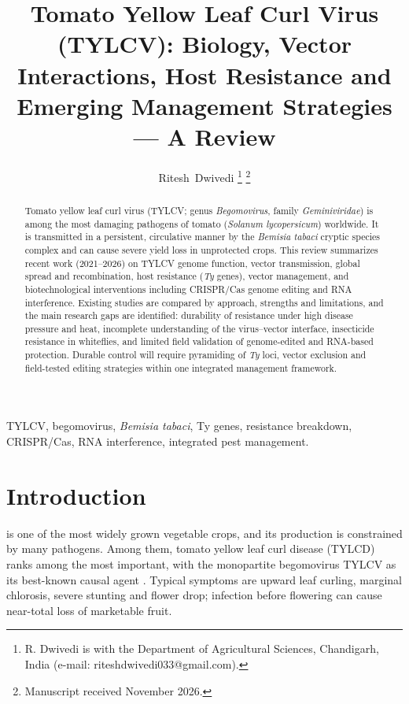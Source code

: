 \documentclass[journal]{IEEEtran}
\begin{document}
\title{Tomato Yellow Leaf Curl Virus (TYLCV): Biology, Vector Interactions, Host Resistance and Emerging Management Strategies --- A Review}

\author{Ritesh~Dwivedi%
\thanks{R. Dwivedi is with the Department of Agricultural Sciences, Chandigarh, India (e-mail: riteshdwivedi033@gmail.com).}%
\thanks{Manuscript received November 2026.}}


\maketitle

\begin{abstract}
Tomato yellow leaf curl virus (TYLCV; genus \textit{Begomovirus}, family \textit{Geminiviridae}) is among the most damaging pathogens of tomato (\textit{Solanum lycopersicum}) worldwide. It is transmitted in a persistent, circulative manner by the \textit{Bemisia tabaci} cryptic species complex and can cause severe yield loss in unprotected crops. This review summarizes recent work (2021--2026) on TYLCV genome function, vector transmission, global spread and recombination, host resistance (\textit{Ty} genes), vector management, and biotechnological interventions including CRISPR/Cas genome editing and RNA interference. Existing studies are compared by approach, strengths and limitations, and the main research gaps are identified: durability of resistance under high disease pressure and heat, incomplete understanding of the virus--vector interface, insecticide resistance in whiteflies, and limited field validation of genome-edited and RNA-based protection. Durable control will require pyramiding of \textit{Ty} loci, vector exclusion and field-tested editing strategies within one integrated management framework.
\end{abstract}

\begin{IEEEkeywords}
TYLCV, begomovirus, \textit{Bemisia tabaci}, Ty genes, resistance breakdown, CRISPR/Cas, RNA interference, integrated pest management.
\end{IEEEkeywords}

\section{Introduction}
 is one of the most widely grown vegetable crops, and its production is constrained by many pathogens. Among them, tomato yellow leaf curl disease (TYLCD) ranks among the most important, with the monopartite begomovirus TYLCV as its best-known causal agent \cite{yan2021}. Typical symptoms are upward leaf curling, marginal chlorosis, severe stunting and flower drop; infection before flowering can cause near-total loss of marketable fruit.
\end{document}
